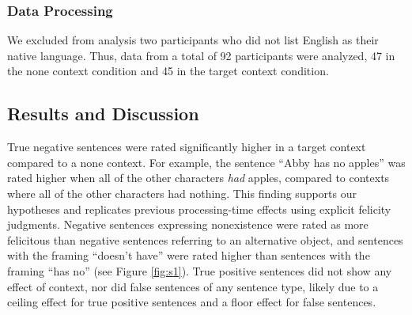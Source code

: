 \documentclass[10pt,letterpaper]{article}
\begin{document}
\subsubsection{Data Processing}

We excluded from analysis two participants who did not list English as their native language.  Thus, data from a total of 92 participants were analyzed, 47 in the none context condition and 45 in the target context condition.  

\subsection{Results and Discussion}

True negative sentences were rated significantly higher in a target context compared to a none context. For example, the sentence ``Abby has no apples'' was rated higher when all of the other characters \emph{had} apples, compared to contexts where all of the other characters had nothing. This finding supports our hypotheses and replicates previous processing-time effects using explicit felicity judgments.  Negative sentences expressing nonexistence were rated as more felicitous than negative sentences referring to an alternative object, and sentences with the framing ``doesn't have'' were rated higher than sentences with the framing ``has no'' (see Figure \ref{fig:s1}). True positive sentences did not show any effect of context, nor did false sentences of any sentence type, likely due to a ceiling effect for true positive sentences and a floor effect for false sentences.  

\end{document}
